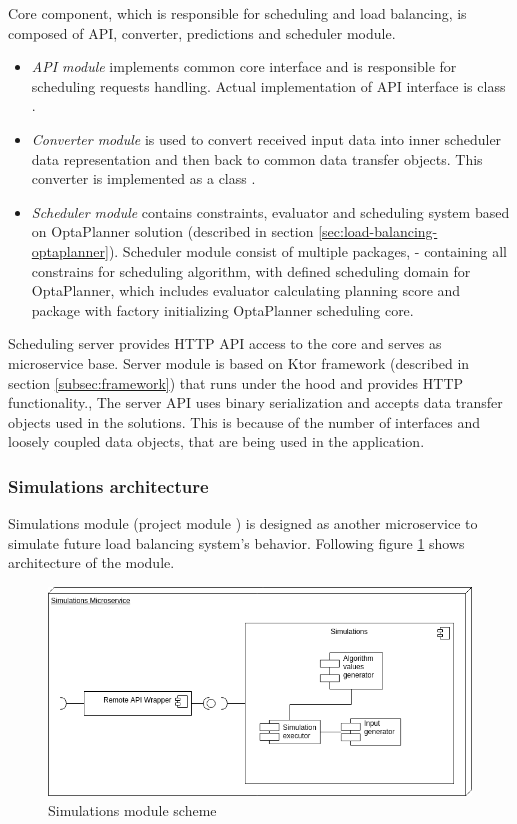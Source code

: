 Core component, 
which is responsible for scheduling and load balancing,
is composed of API, converter, predictions and scheduler module.
\begin{itemize}
    \item \textit{API module} implements common core interface  
    and is responsible for scheduling requests handling.
    Actual implementation of API interface is class .
    \item \textit{Converter module} is used to convert received input data into inner scheduler data representation 
    and then back to common data transfer objects. 
    This converter is implemented as a class .
    \item \textit{Scheduler module} contains constraints, evaluator and scheduling system based on OptaPlanner solution
    (described in section \ref{sec:load-balancing-optaplanner}).
    Scheduler module consist of multiple packages, 
     - containing all constrains for scheduling algorithm,
     with defined scheduling domain for OptaPlanner,
     which includes evaluator calculating planning score
    and  package with factory initializing OptaPlanner scheduling core.
\end{itemize}

Scheduling server provides HTTP API access to the core
and serves as microservice base.
Server module is based on Ktor framework (described in section \ref{subsec:framework})
that runs under the hood and provides HTTP functionality.,
The server API uses binary serialization and accepts data transfer objects used in the solutions.
This is because of the number of interfaces and loosely coupled data objects,
that are being used in the application.

\subsubsection{Simulations architecture}\label{subsec:simulations-architecture}
Simulations module (project module ) is designed as another microservice to simulate future load balancing system's behavior.
Following figure \ref{fig:simulations-arch} shows architecture of the module.  

\begin{figure}[ht]
    \includegraphics[width=\textwidth]{i_simulations.png}
    \centering
    \caption{Simulations module scheme}
    \label{fig:simulations-arch}
\end{figure}

